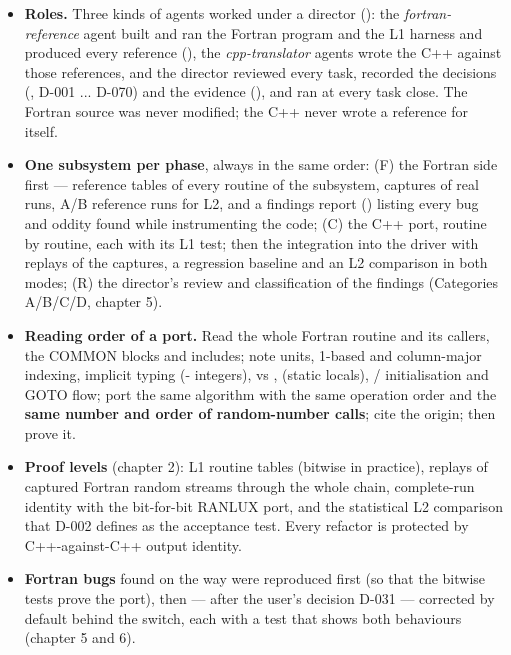 \begin{itemize}
\item \textbf{Roles.} Three kinds of agents worked under a director (): the \emph{fortran-reference} agent built
and ran the Fortran program and the L1 harness and produced every reference (), the
\emph{cpp-translator} agents wrote the C++ against those references, and the director reviewed every task, recorded the
decisions (, D-001 ... D-070) and the evidence (), and ran  at
every task close. The Fortran source was never modified; the C++ never wrote a reference for itself.
\item \textbf{One subsystem per phase}, always in the same order: (F) the Fortran side first — reference tables of every routine
of the subsystem, captures of real runs, A/B reference runs for L2, and a findings report
() listing every bug and oddity found while instrumenting the code; (C) the C++ port,
routine by routine, each with its L1 test; then the integration into the driver with replays of the captures, a
regression baseline and an L2 comparison in both modes; (R) the director's review and classification of the findings
(Categories A/B/C/D, chapter 5).
\item \textbf{Reading order of a port.} Read the whole Fortran routine and its callers, the COMMON blocks and includes; note units,
1-based and column-major indexing, implicit typing (- integers),  vs , 
(static locals), / initialisation and GOTO flow; port the same algorithm with the same operation order and
the \textbf{same number and order of random-number calls}; cite the origin; then prove it.
\item \textbf{Proof levels} (chapter 2): L1 routine tables (bitwise in practice), replays of captured Fortran random streams
through the whole chain, complete-run identity with the bit-for-bit RANLUX port, and the statistical L2 comparison
that D-002 defines as the acceptance test. Every refactor is protected by C++-against-C++ output identity.
\item \textbf{Fortran bugs} found on the way were reproduced first (so that the bitwise tests prove the port), then — after the
user's decision D-031 — corrected by default behind the  switch, each with a test that shows both
behaviours (chapter 5 and 6).
\end{itemize}
